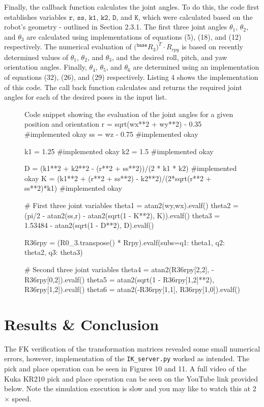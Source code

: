 \documentclass[a4paper]{article}
\begin{document}
Finally, the callback function calculates the joint angles. To do this, the code first establishes variables $\texttt{r}$, $\texttt{ss}$, $\texttt{k1}$, $\texttt{k2}$, $\texttt{D}$, and $\texttt{K}$, which were calculated based on the robot's geometry - outlined in Section 2.3.1. The first three joint angles $\theta_1$, $\theta_2$, and $\theta_3$ are calculated using implementations of equations (5), (18), and (12) respectively. The numerical evaluation of $\big({}^{\texttt{base}}R_3 \big)^T \cdot R_{rpy}$ is based on recently determined values of $\theta_1$, $\theta_2$, and $\theta_3$, and the desired roll, pitch, and yaw orientation angles. Finally, $\theta_4$, $\theta_5$, and $\theta_6$ are determined using an implementation of equations (32), (26), and (29) respectively. Listing 4 shows the implementation of this code. The call back function calculates and returns the required joint angles for each of the desired poses in the input list.

\begin{figure}[h]\footnotesize
	\begin{sexylisting}{Code snippet showing the evaluation of the joint angles for a given position and orientation}
r = sqrt(wx**2 + wy**2) - 0.35 #implemented okay
ss = wz - 0.75 #implemented okay

k1 = 1.25 #implemented okay
k2 = 1.5 #implemented okay

D = (k1**2 + k2**2 - (r**2 + ss**2))/(2 * k1 * k2) #implemented okay
K = (k1**2 + (r**2 + ss**2) - k2**2)/(2*sqrt(r**2 + ss**2)*k1) #implemented okay

# First three joint variables
theta1 = atan2(wy,wx).evalf()
theta2 = (pi/2 - atan2(ss,r) - atan2(sqrt(1 - K**2), K)).evalf()
theta3 = 1.53484 - atan2(sqrt(1 - D**2), D).evalf()

R36rpy = (R0_3.transpose() * Rrpy).evalf(subs={q1: theta1, q2: theta2, q3: theta3})

# Second three joint variables
theta4 = atan2(R36rpy[2,2], -R36rpy[0,2]).evalf()
theta5 = atan2(sqrt(1 - R36rpy[1,2]**2), R36rpy[1,2]).evalf()
theta6 = atan2(-R36rpy[1,1], R36rpy[1,0]).evalf()
	\end{sexylisting}
\end{figure}

\newpage

\section{Results \& Conclusion}
The FK verification of the transformation matrices revealed some small numerical errors, however, implementation of the \verb|IK_server.py| worked as intended. The pick and place operation can be seen in Figures 10 and 11. A full video of the Kuka KR210 pick and place operation can be seen on the YouTube link provided below. Note the simulation execution is slow and you may like to watch this at 2 $\times$ speed.
\end{document}
